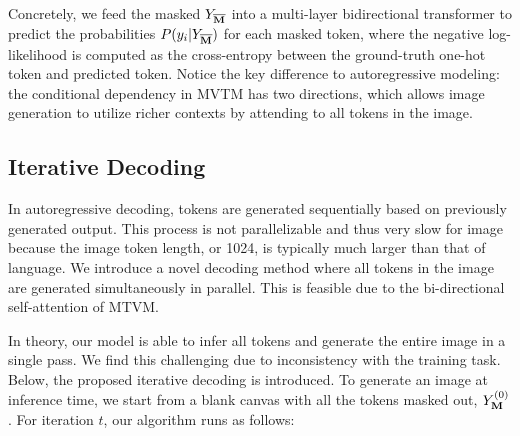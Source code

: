 \noindent Concretely, we feed the masked $Y_{{\overline{\mathbf{M}}}}$ into a multi-layer bidirectional transformer to predict the probabilities $P(y_i | Y_{{\overline{\mathbf{M}}}} )$ for each masked token, where the negative log-likelihood is computed as the cross-entropy between the ground-truth one-hot token and predicted token.
Notice the key difference to autoregressive modeling: the conditional dependency in MVTM has two directions, which allows image generation to utilize richer contexts by attending to all tokens in the image.

\subsection{Iterative Decoding}
\label{ssec:decoding}
In autoregressive decoding, tokens are generated sequentially based on previously generated output. This process is not parallelizable and thus very slow for image because the image token length,  or 1024, is typically much larger than that of language. We introduce a novel decoding method where all tokens in the image are generated simultaneously in parallel. This is feasible due to the bi-directional self-attention of MTVM. 

In theory, our model is able to infer all tokens and generate the entire image in a single pass. We find this challenging due to inconsistency with the training task. Below, the proposed iterative decoding is introduced.
To generate an image at inference time, we start from a blank canvas with all the tokens masked out, \ie $Y_{\mathbf{M}}^{(0)}$. For iteration $t$, our algorithm runs as follows: 
 
